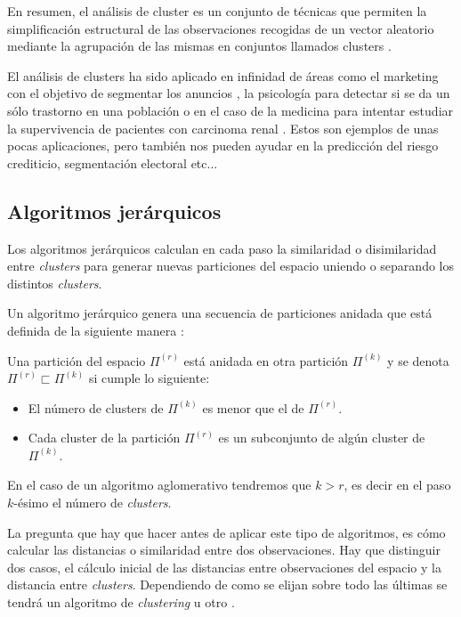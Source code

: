 \noindent En resumen, el análisis de cluster es un conjunto de técnicas que permiten la simplificación estructural de las observaciones recogidas de un vector aleatorio mediante la agrupación de las mismas en conjuntos llamados clusters \cite{Everitt 2011}. 

\noindent El análisis de clusters ha sido aplicado en infinidad de áreas como el marketing con el objetivo de segmentar los anuncios \cite{Okazaki 2006}, la psicología para detectar si se da un sólo trastorno en una población \cite{Everitt 2002} o en el caso de la medicina para intentar estudiar la supervivencia de pacientes con carcinoma renal \cite{Witten 2010}. Estos son ejemplos de unas pocas aplicaciones, pero también nos pueden ayudar en la predicción del riesgo crediticio, segmentación electoral etc... 

\subsection{Algoritmos jerárquicos}

\noindent Los algoritmos jerárquicos calculan en cada paso la similaridad o disimilaridad entre \emph{clusters} para generar nuevas particiones del espacio uniendo o separando los distintos \emph{clusters}.

\noindent Un algoritmo jerárquico genera una secuencia de particiones anidada que está definida de la siguiente manera \cite{Scitovski 2021} :
\begin{defi}
Una partición del espacio $\Pi^{(r)}$ está anidada en otra partición $\Pi^{(k)}$ y se denota $\Pi^{(r)} \sqsubset \Pi^{(k)}$ si cumple lo siguiente:
\begin{itemize}
\item El número de clusters de $\Pi^{(k)}$ es menor que el de $\Pi^{(r)}$. 
\item Cada cluster de la partición $\Pi^{(r)}$ es un subconjunto de algún cluster de $\Pi^{(k)}$. 
\end{itemize}
En el caso de un algoritmo aglomerativo tendremos que $k>r$, es decir en el paso $k$-ésimo el número de \emph{clusters}.

\end{defi}

\noindent La pregunta que hay que hacer antes de aplicar este tipo de algoritmos, es cómo calcular las distancias o similaridad entre dos observaciones. Hay que distinguir dos casos, el cálculo inicial de las distancias entre observaciones del espacio y la distancia entre \emph{clusters}. Dependiendo de como se elijan sobre todo las últimas se tendrá un algoritmo de \emph{clustering} u otro \cite{Peña 2002}. 

